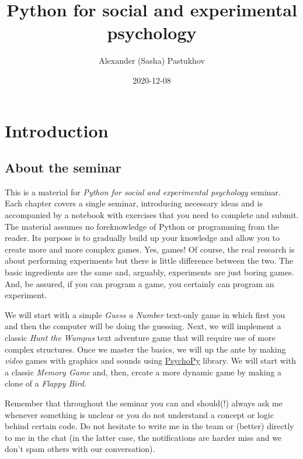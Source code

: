 \documentclass[
]{book}
\title{Python for social and experimental psychology}
\author{Alexander (Sasha) Pastukhov}
\date{2020-12-08}
\begin{document}
\maketitle

{
\setcounter{tocdepth}{1}
\tableofcontents
}
\hypertarget{introduction}{%
\chapter*{Introduction}\label{introduction}}

\hypertarget{about-the-seminar}{%
\section*{About the seminar}\label{about-the-seminar}}

This is a material for \emph{Python for social and experimental psychology} seminar. Each chapter covers a single seminar, introducing necessary ideas and is accompanied by a notebook with exercises that you need to complete and submit. The material assumes no foreknowledge of Python or programming from the reader. Its purpose is to gradually build up your knowledge and allow you to create more and more complex games. Yes, games! Of course, the real research is about performing experiments but there is little difference between the two. The basic ingredients are the same and, arguably, experiments are just boring games. And, be assured, if you can program a game, you certainly can program an experiment.

We will start with a simple \emph{Guess a Number} text-only game in which first you and then the computer will be doing the guessing. Next, we will implement a classic \emph{Hunt the Wumpus} text adventure game that will require use of more complex structures. Once we master the basics, we will up the ante by making \emph{video} games with graphics and sounds using \href{https://psychopy.org/}{PsychoPy} library. We will start with a classic \emph{Memory Game} and, then, create a more dynamic game by making a clone of a \emph{Flappy Bird}.

Remember that throughout the seminar you can and should(!) always ask me whenever something is unclear or you do not understand a concept or logic behind certain code. Do not hesitate to write me in the team or (better) directly to me in the chat (in the latter case, the notifications are harder miss and we don't spam others with our conversation).
\end{document}
